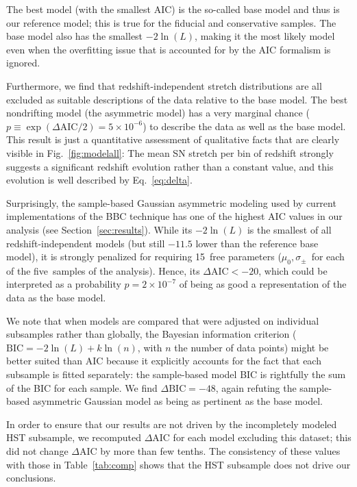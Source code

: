 \documentclass[]{aa}
\begin{document}
The best model (with the smallest AIC) is the so-called base model and thus is
our reference model; this is true for the fiducial and conservative samples.
The base model also has the smallest $-2\ln(L)$, making it the most likely model
even when the overfitting issue that is accounted for by the AIC formalism is
ignored.

Furthermore, we find that redshift-independent stretch distributions are all
excluded as suitable descriptions of the data relative to the base model. The
best nondrifting model (the asymmetric model) has a very marginal chance ($p
\equiv \exp\left(\Delta\mathrm{AIC}/2\right) = 5\times10^{-6}$) to describe the
data as well as the base model. This result is just a quantitative assessment of
qualitative facts that are clearly visible in Fig.~\ref{fig:modelall}: The mean
SN stretch per bin of redshift strongly suggests a significant redshift
evolution rather than a constant value, and this evolution is well described by
Eq.~\ref{eq:delta}.

Surprisingly, the sample-based Gaussian asymmetric modeling used by current
implementations of the BBC technique \citep{scolnic2016, kessler2017} has one of
the highest AIC values in our analysis (see Section~\ref{sec:results}). While
its $-2\ln(L)$ is the smallest of all redshift-independent models (but still
$-11.5$ lower than the reference base model), it is strongly penalized for
requiring 15~free parameters ($\mu_0, \sigma_{\pm}$~for each of the five~samples
of the analysis). Hence, its $\Delta\mathrm{AIC}<-20$, which could be
interpreted as a probability $p=2\times 10^{-7}$ of being as good a
representation of the data as the base model.

We note that when models are compared that were adjusted on individual
subsamples rather than globally, the Bayesian information criterion
($\mathrm{BIC} = -2\ln(L) + k\ln(n)$, with $n$ the number of data points) might
be better suited than AIC because it explicitly accounts for the fact that each
subsample is fitted separately: the sample-based model BIC is rightfully the sum
of the BIC for each sample. We find $\Delta\mathrm{BIC}=-48$, again refuting the
sample-based asymmetric Gaussian model as being as pertinent as the base model.

In order to ensure that our results are not driven by the incompletely modeled
HST subsample, we recomputed $\Delta$AIC for each model excluding this dataset;
this did not change $\Delta$AIC by more than few tenths. The consistency of
these values with those in Table~\ref{tab:comp} shows that the HST subsample
does not drive our conclusions.
\end{document}
